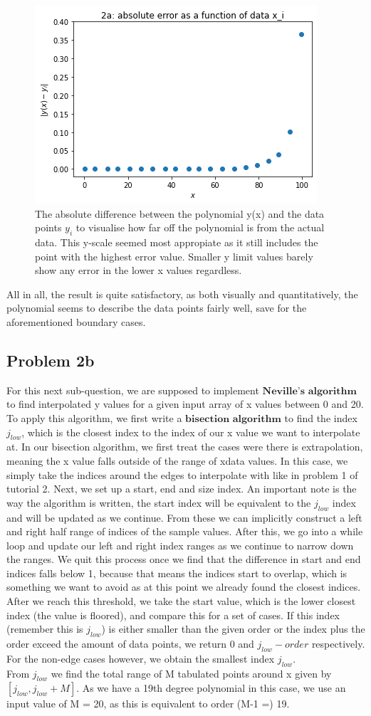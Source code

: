\begin{figure}[h!]
  \centering
  \includegraphics[width=0.6\linewidth]{problem2a2.png}
  \caption{The absolute difference between the polynomial y(x) and the data points $y_i$ to visualise how far off the polynomial is from the actual data. This y-scale seemed most appropiate as it still includes the point with the highest error value. Smaller y limit values barely show any error in the lower x values regardless.}
  \label{fig:fig2}
\end{figure}

All in all, the result is quite satisfactory, as both visually and quantitatively, the polynomial seems to describe the data points fairly well, save for the aforementioned boundary cases. 

\subsection{Problem 2b}

For this next sub-question, we are supposed to implement $\textbf{Neville's algorithm}$ to find interpolated y values for a given input array of x values between 0 and 20. To apply this algorithm, we first write a $\textbf{bisection algorithm}$ to find the index $j_{low}$, which is the closest index to the index of our x value we want to interpolate at. In our bisection algorithm, we first treat the cases were there is extrapolation, meaning the x value falls outside of the range of xdata values. In this case, we simply take the indices around the edges to interpolate with like in problem 1 of tutorial 2. Next, we set up a start, end and size index. An important note is the way the algorithm is written, the start index will be equivalent to the $j_{low}$ index and will be updated as we continue. From these we can implicitly construct a left and right half range of indices of the sample values. After this, we go into a while loop and update our left and right index ranges as we continue to narrow down the ranges. We quit this process once we find that the difference in start and end indices falls below 1, because that means the indices start to overlap, which is something we want to avoid as at this point we already found the closest indices. After we reach this threshold, we take the start value, which is the lower closest index (the value is floored), and compare this for a set of cases. If this index (remember this is $j_{low}$) is either smaller than the given order or the index plus the order exceed the amount of data points, we return 0 and $j_{low} - order$ respectively. For the non-edge cases however, we obtain the smallest index $j_{low}$.\\

From $j_{low}$ we find the total range of M tabulated points around x given by $[j_{low},j_{low}+M]$. As we have a 19th degree polynomial in this case, we use an input value of M = 20, as this is equivalent to order (M-1 =) 19. 